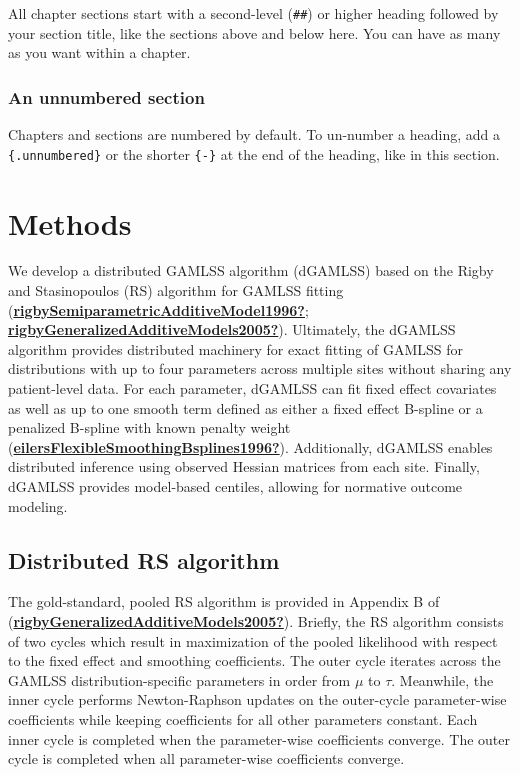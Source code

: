 \documentclass[
  12pt,
]{article}
\begin{document}
All chapter sections start with a second-level (\texttt{\#\#}) or higher heading followed by your section title, like the sections above and below here. You can have as many as you want within a chapter.

\hypertarget{an-unnumbered-section}{%
\subsubsection*{An unnumbered section}\label{an-unnumbered-section}}

Chapters and sections are numbered by default. To un-number a heading, add a \texttt{\{.unnumbered\}} or the shorter \texttt{\{-\}} at the end of the heading, like in this section.

\hypertarget{methods}{%
\section{Methods}\label{methods}}

We develop a distributed GAMLSS algorithm (dGAMLSS) based on the Rigby and Stasinopoulos (RS) algorithm for GAMLSS fitting (\protect\hyperlink{ref-rigbySemiparametricAdditiveModel1996}{\textbf{rigbySemiparametricAdditiveModel1996?}}; \protect\hyperlink{ref-rigbyGeneralizedAdditiveModels2005}{\textbf{rigbyGeneralizedAdditiveModels2005?}}). Ultimately, the dGAMLSS algorithm provides distributed machinery for exact fitting of GAMLSS for distributions with up to four parameters across multiple sites without sharing any patient-level data. For each parameter, dGAMLSS can fit fixed effect covariates as well as up to one smooth term defined as either a fixed effect B-spline or a penalized B-spline with known penalty weight (\protect\hyperlink{ref-eilersFlexibleSmoothingBsplines1996}{\textbf{eilersFlexibleSmoothingBsplines1996?}}). Additionally, dGAMLSS enables distributed inference using observed Hessian matrices from each site. Finally, dGAMLSS provides model-based centiles, allowing for normative outcome modeling.

\hypertarget{distributed-rs-algorithm}{%
\subsection{Distributed RS algorithm}\label{distributed-rs-algorithm}}

The gold-standard, pooled RS algorithm is provided in Appendix B of (\protect\hyperlink{ref-rigbyGeneralizedAdditiveModels2005}{\textbf{rigbyGeneralizedAdditiveModels2005?}}). Briefly, the RS algorithm consists of two cycles which result in maximization of the pooled likelihood with respect to the fixed effect and smoothing coefficients. The outer cycle iterates across the GAMLSS distribution-specific parameters in order from \(\mu\) to \(\tau\). Meanwhile, the inner cycle performs Newton-Raphson updates on the outer-cycle parameter-wise coefficients while keeping coefficients for all other parameters constant. Each inner cycle is completed when the parameter-wise coefficients converge. The outer cycle is completed when all parameter-wise coefficients converge.
\end{document}
